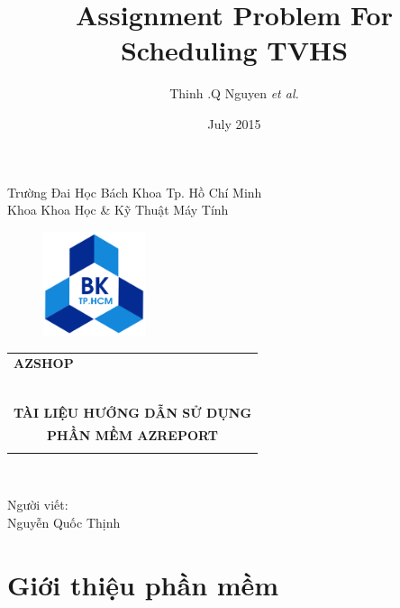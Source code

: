 \documentclass[11pt]{article}
\title{Assignment Problem For Scheduling TVHS}
\author{Thinh .Q Nguyen \textit{et al.}}
\date{July 2015}
\begin{document}
\begin{titlepage}
\begin{flushleft}
\noindent Trường Đai Học Bách Khoa Tp. Hồ Chí Minh\\
Khoa Khoa Học \& Kỹ Thuật Máy Tính\\
\end{flushleft}

\vspace{1cm}

\begin{figure}[h!]
\begin{center}
\includegraphics[width=30mm]{hcmut.png}
\end{center}
\end{figure}

\vspace{1cm}


\begin{center}
\begin{tabular}{c}
\multicolumn{1}{l}{
\textbf{{\Large AZSHOP}}
}\\
~~\\
\hline
\\
\textbf{{\Huge TÀI LIỆU HƯỚNG DẪN SỬ DỤNG}}\\
\textbf{{\Huge   PHẦN MỀM AZREPORT}}\\
\\
\hline
\end{tabular}
\end{center}

\vspace{3cm}

\begin{minipage}[t]{0.60\linewidth}
\,
\end{minipage}
\begin{minipage}[t]{0.40\linewidth}
Người viết:\\
Nguyễn Quốc Thịnh
\end{minipage}\end{titlepage}

\newpage

\tableofcontents %

\newpage
\section{Giới thiệu phần mềm}
\end{document}
